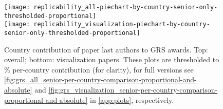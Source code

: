 \documentclass[conference,svgnames]{vgtc}                     %
\begin{document}
\begin{figure}
	\centering
	\texttt{[image: replicability\_all-piechart-by-country-senior-only-thresholded-proportional]}\\[1ex]%
	\texttt{[image: replicability\_visualization-piechart-by-country-senior-only-thresholded-proportional]}%
	\caption{Country contribution of paper last authors to GRS awards. Top: overall; bottom: visualization papers. These plots are thresholded to \GrsiCountryPieChartThreshold\% per-country contribution (for clarity), for full versions see \autoref{fig:grs_all_senior-per-country-comparison-proportional-and-absolute} and \autoref{fig:grs_visualization_senior-per-country-comparison-proportional-and-absolute} in \autoref{app:plots}, respectively.}
	\label{fig:vis-grs-per-country-proportional-last-authors}
\end{figure}
\end{document}
